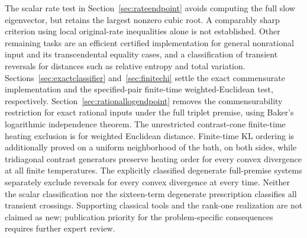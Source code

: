 \documentclass[11pt]{article}
\begin{document}
The scalar rate test in Section~\ref{sec:rateendpoint} avoids computing the full slow eigenvector, but retains the largest nonzero cubic root. A comparably sharp criterion using local original-rate inequalities alone is not established. Other remaining tasks are an efficient certified implementation for general nonrational input and its transcendental equality cases, and a classification of transient reversals for distances such as relative entropy and total variation. Sections~\ref{sec:exactclassifier} and~\ref{sec:finitechi} settle the exact commensurate implementation and the specified-pair finite-time weighted-Euclidean test, respectively. Section~\ref{sec:rationallogendpoint} removes the commensurability restriction for exact rational inputs under the full triplet premise, using Baker's logarithmic independence theorem. The unrestricted contrast-cone finite-time heating exclusion is for weighted Euclidean distance. Finite-time KL ordering is additionally proved on a uniform neighborhood of the bath, on both sides, while tridiagonal contrast generators preserve heating order for every convex divergence at all finite temperatures. The explicitly classified degenerate full-premise systems separately exclude reversals for every convex divergence at every time. Neither the scalar classification nor the sixteen-term degenerate prescription classifies all transient crossings. Supporting classical tools and the rank-one realization are not claimed as new; publication priority for the problem-specific consequences requires further expert review.
\end{document}

